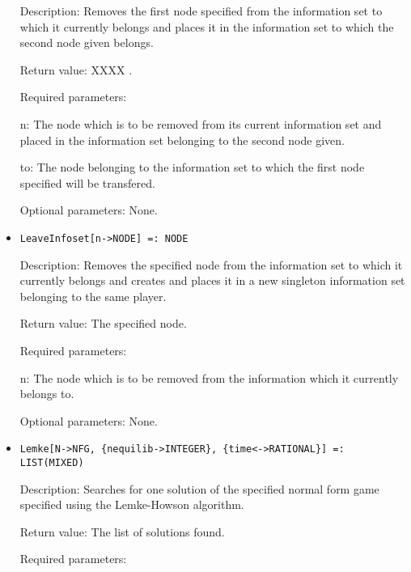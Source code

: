 \begin{itemize}
\bd
\item
[Description:] Removes the first node specified from the information
set to which it currently belongs and places it in the information set
to which the second node given belongs.
\item
[Return value:] XXXX .
\item
[Required parameters:]\hfil\null
	  
\bd
\item
[n:] The node which is to be removed from its current information set
and placed in the information set belonging to the second node given.
\item
[to:] The node belonging to the information set to which the first
node specified will be transfered.
\ed

\item
[Optional parameters:] None.
\ed

\item
\protect \large \begin{verbatim}
LeaveInfoset[n->NODE] =: NODE
\end{verbatim}\normalsize

\bd
\item
[Description:] Removes the specified node from the information set to
which it currently belongs and creates and places it in a new
singleton information set belonging to the same player.
\item
[Return value:] The specified node.
\item
[Required parameters:]\hfil\null
	  
\bd
\item
[n:] The node which is to be removed from the information which it
currently belongs to.
\ed

\item
[Optional parameters:] None.
\ed

\item
\protect \large \begin{verbatim}
Lemke[N->NFG, {nequilib->INTEGER}, {time<->RATIONAL}] =: LIST(MIXED)
\end{verbatim}\normalsize

\bd
\item
[Description:] Searches for one solution of the specified normal form
game specified using the Lemke-Howson algorithm.
\item
[Return value:] The list of solutions found.
\item
[Required parameters:]\hfil\null


\end{itemize}
